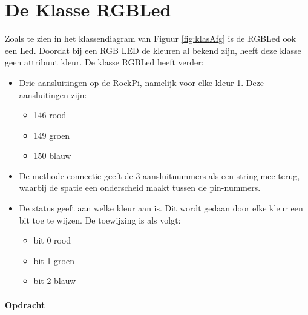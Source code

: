\section{De Klasse RGBLed} \label{sec:rgb}

Zoals te zien in het klassendiagram van Figuur \ref{fig:klasAfg} is de RGBLed ook een Led. Doordat bij een RGB LED de kleuren al bekend zijn, heeft deze klasse geen attribuut kleur. De klasse RGBLed heeft verder:
\begin{itemize}
	\item Drie aansluitingen op de RockPi, namelijk voor elke kleur 1. Deze aansluitingen zijn:
	\begin{itemize}
		\item 146 rood
		\item 149 groen
		\item 150 blauw
	\end{itemize}
    \item De methode connectie geeft de 3 aansluitnummers als een string mee terug, waarbij de spatie een onderscheid maakt tussen de pin-nummers.
    \item De status geeft aan welke kleur aan is. Dit wordt gedaan door elke kleur een bit toe te wijzen. De toewijzing is als volgt:
    \begin{itemize}
    	\item bit 0 rood
    	\item bit 1 groen
    	\item bit 2 blauw
    \end{itemize}

\end{itemize}
\newpage
 \paragraph{Opdracht}
 
